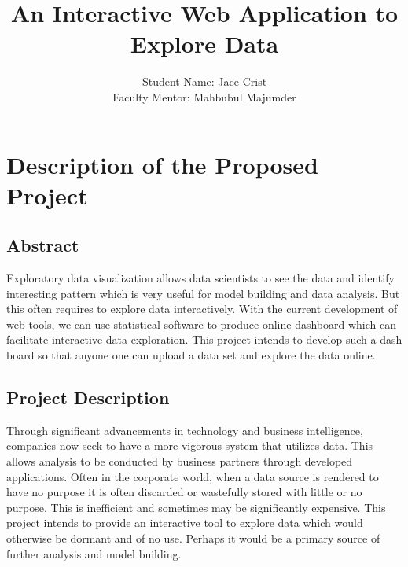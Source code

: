 \documentclass[12pt]{article}
\title{An Interactive Web Application to Explore Data}
\author{Student Name: Jace Crist \\
Faculty Mentor: Mahbubul Majumder}
\date{}
\begin{document}
\maketitle

\doublespacing



\section{Description of the Proposed Project}

\subsection{Abstract}

Exploratory data visualization allows data scientists to see the data and identify interesting pattern which is very useful for model building and data analysis. But this often requires to explore data interactively. With the current development of web tools, we can use statistical software to produce online dashboard which can facilitate interactive data exploration. This project intends to develop such a dash board so that anyone one can upload a data set and explore the data online.

\subsection{Project Description} %

Through significant advancements in technology and business intelligence, companies now seek to have a more vigorous system that utilizes data.  This allows analysis to be conducted by business partners through developed applications. Often in the corporate world, when a data source is rendered to have no purpose it is often discarded or wastefully stored with little or no purpose. This is inefficient and sometimes may be  significantly expensive. This project intends to provide an interactive tool to explore data which would otherwise be dormant and of no use. Perhaps it would be a primary source of further analysis and model building.
\end{document}
